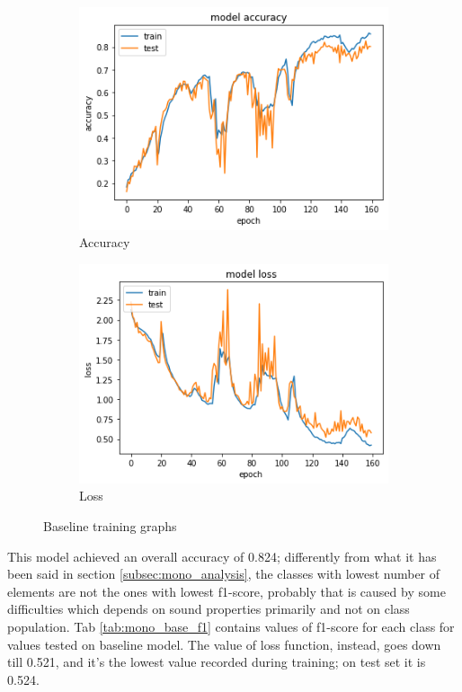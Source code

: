 \documentclass{article}
\begin{document}
\begin{figure}[h]
	\centering
	\begin{subfigure}{.5\textwidth}
		\centering
		\includegraphics[width=.9\linewidth]{./images/mono/baseline_acc.png}
		\caption{Accuracy}
	\end{subfigure}%
	\begin{subfigure}{.5\textwidth}
		\centering
		\includegraphics[width=.9\linewidth]{./images/mono/baseline_loss.png}
		\caption{Loss}
	\end{subfigure}
	\caption{Baseline training graphs}
	\label{fig:mono_base_result}
\end{figure}

This model achieved an overall accuracy of 0.824; differently from what it has been said in section \ref{subsec:mono_analysis}, the classes with lowest number of elements are not the ones with lowest f1-score, probably that is caused by some difficulties which depends on sound properties primarily and not on class population. Tab \ref{tab:mono_base_f1} contains values of f1-score for each class for values tested on baseline model. The value of loss function, instead, goes down till 0.521, and it's the lowest value recorded during training; on test set it is 0.524. 
\end{document}
